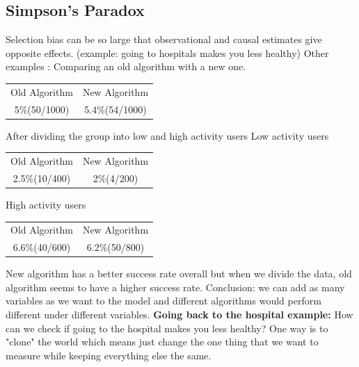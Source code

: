 \documentclass[a4paper]{article}
\begin{document}
\subsection{Simpson's Paradox}
Selection bias can be so large that observational and causal estimates give opposite effects. \newline
(example: going to hospitals makes you less healthy) \newline
Other examples : Comparing an old algorithm with a new one. \newline

\begin{tabular}{c c}
Old Algorithm & New Algorithm  \\
5\%(50/1000) & 5.4\%(54/1000) \newline
\end{tabular} \newline \newline
After dividing the group into low and high activity users \newline
Low activity users \newline
\begin{tabular}{c c}
Old Algorithm & New Algorithm  \\
2.5\%(10/400) & 2\%(4/200) \newline
\end{tabular} \newline \newline
High activity users \newline
\begin{tabular}{c c}
Old Algorithm & New Algorithm  \\
6.6\%(40/600) & 6.2\%(50/800)
\end{tabular} \newline \newline
New algorithm has a better success rate overall but when we divide the data, old algorithm seems to have a higher success rate. \newline
Conclusion: we can add as many variables as we want to the model and different algorithms would perform different under different variables. \newline \newline
\textbf{Going back to the hospital example:} \newline
How can we check if going to the hospital makes you less healthy? \newline
One way is to "clone" the world which means just change the one thing that we want to measure while keeping everything else the same. \newline
\end{document}
